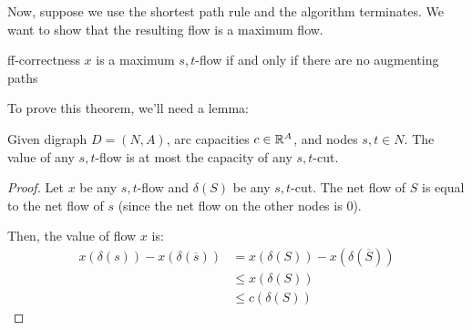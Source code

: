 Now, suppose we use the shortest path rule and the algorithm terminates. We want to show that the resulting flow is a maximum flow.
\begin{theorem}{}{ff-correctness}
    $x$ is a maximum $s,t$-flow if and only if there are no augmenting paths
\end{theorem}

To prove this theorem, we'll need a lemma:
\begin{lemma}{}{}
    Given digraph $D = (N,A)$, arc capacities $c \in \mathbb{R}^A$, and nodes $s,t \in N$. The value of any $s,t$-flow is at most the capacity of any $s,t$-cut.
\end{lemma}
\begin{proof}
    Let $x$ be any $s,t$-flow and $\delta(S)$ be any $s,t$-cut. The net flow of $S$ is equal to the net flow of $s$ (since the net flow on the other nodes is $0$).

    Then, the value of flow $x$ is:
    \begin{align*}
        x(\delta(s)) - x(\delta(\overline{s})) &= x(\delta(S)) - x(\delta(\overline{S})) \\
        &\leq x(\delta(S)) \\
        &\leq c(\delta(S))
    \end{align*}
\end{proof}

